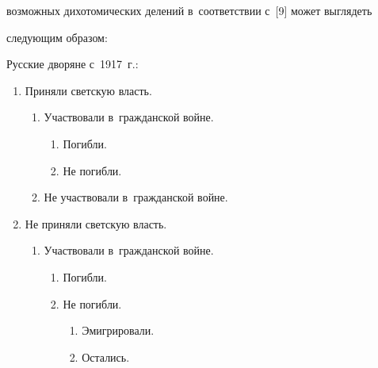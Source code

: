 возможных дихотомических делений в~соответствии с~[9] может выглядеть 


следующим образом:





\smallskip


    


    Русские дворяне с~1917~г.:


    \begin{enumerate}[1.]


    \item Приняли светскую власть.


    \begin{enumerate}[{1}.1.]


    \item Участвовали в~гражданской войне.


    \begin{enumerate}[{1.1.}1.]


    \item Погибли.


    \item Не погибли.


    \end{enumerate}


    \item Не участвовали в~гражданской войне.


    \end{enumerate}


    \item Не приняли светскую власть.


    \begin{enumerate}[{2}.1.]


    \item Участвовали в~гражданской войне.


    \begin{enumerate}[{2.1.}1.]


    \item  Погибли.


    \item Не погибли.


    \begin{enumerate}[{2.1.2.}1.]


    \item Эмигрировали.


    \item Остались.


    \end{enumerate}



\end{enumerate}
\end{enumerate}
\end{enumerate}
